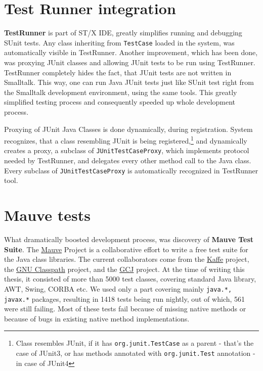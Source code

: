\documentclass[11pt,twoside,a4paper]{book}
\begin{document}
\section{Test Runner integration}

\textbf{TestRunner} is part of ST/X IDE, greatly simplifies running and debugging SUnit tests. 
Any class inheriting from \texttt{TestCase} loaded in the system, was automatically visible in TestRunner. 
Another improvement, which has been done, was proxying JUnit classes and allowing JUnit tests to be run using TestRunner. 
TestRunner completely hides the fact, that JUnit tests are not written in Smalltalk. This way, one can run Java JUnit tests
just like SUnit test right from the Smalltalk development environment, using the same tools. This greatly simplified 
testing process and consequently speeded up whole development process.

Proxying of JUnit Java Classes is done dynamically, during registration. 
System recognizes, that a class resembling JUnit is being registered,\footnote{Class resembles JUnit, if it has \texttt{org.junit.TestCase} as a parent - that's the case of JUnit3, or has methods annotated with \texttt{org.junit.Test} annotation - in case of JUnit4} and dynamically creates a proxy, a subclass of \texttt{JUnitTestCaseProxy}, which implements protocol needed by TestRunner, and delegates every other method call to the Java class. 
Every subclass of \texttt{JUnitTestCaseProxy} is automatically recognized in TestRunner tool.

\section{Mauve tests}

What dramatically boosted development process, was discovery of \textbf{Mauve Test Suite}. 
The \href{http://sourceware.org/mauve/}{Mauve} Project is a collaborative effort to write a free test suite for the Java class libraries. 
The current collaborators come from the \href{https://github.com/kaffe/kaffe}{Kaffe} project, the \href{http://www.gnu.org/software/classpath/}{GNU Classpath} project, and the \href{http://gcc.gnu.org/java/}{GCJ} project. 
At the time of writing this thesis, it consisted of more than 5000 test classes, covering standard Java library, AWT, Swing, CORBA etc. 
We used only a part covering mainly \texttt{java.*, javax.*} packages, resulting in 1418 tests being run nightly, out of which, 561 were still failing.
Most of these tests fail because of missing native methods or because of bugs in existing native method implementations. 
\end{document}

